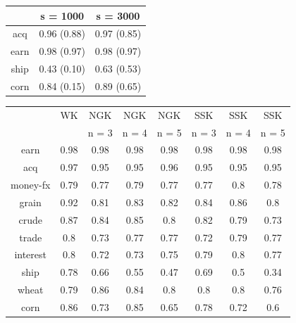 \begin{tabular}{ c | c | c | }
	& s = 1000 & s = 3000   \\ \hline
	acq & 0.96 (0.88)& 0.97 (0.85)\\ \hline
	earn & 0.98 (0.97) & 0.98  (0.97) \\ \hline
	ship & 0.43 (0.10) & 0.63  (0.53) \\ \hline
	corn & 0.84 (0.15) & 0.89 (0.65) \\ \hline
\end{tabular}



\begin{tabular}{ c | c | c | c | c | c | c | c |}
	& WK & NGK & NGK  & NGK  & SSK & SSK& SSK \\ 
	&  & n = 3& n = 4 & n = 5 & n = 3& n = 4 & n = 5 \\ \hline
	earn & 0.98 & 0.98 &  0.98&  0.98 & 0.98 & 0.98 & 0.98 \\ \hline
	acq & 0.97 & 0.95 &  0.95 &  0.96 & 0.95 & 0.95 & 0.95 \\ \hline
	money-fx & 0.79 & 0.77 &  0.79 & 0.77 & 0.77 & 0.8 & 0.78 \\ \hline
	grain & 0.92 & 0.81 &  0.83& 0.82 & 0.84 & 0.86 & 0.8 \\ \hline
	crude & 0.87 & 0.84 &  0.85 & 0.8 & 0.82 & 0.79 & 0.73 \\ \hline
	trade & 0.8 & 0.73 &  0.77 & 0.77 & 0.72 & 0.79 & 0.77 \\ \hline
	interest & 0.8 & 0.72 &  0.73 & 0.75 & 0.79 & 0.8 & 0.77 \\ \hline
	ship & 0.78 & 0.66 &  0.55 & 0.47 & 0.69 & 0.5 & 0.34 \\ \hline
	wheat & 0.79 & 0.86 &  0.84 & 0.8 & 0.8 & 0.8 & 0.76 \\ \hline
	corn & 0.86 & 0.73 &  0.85 & 0.65 & 0.78 & 0.72 & 0.6 \\ \hline	
\end{tabular}
